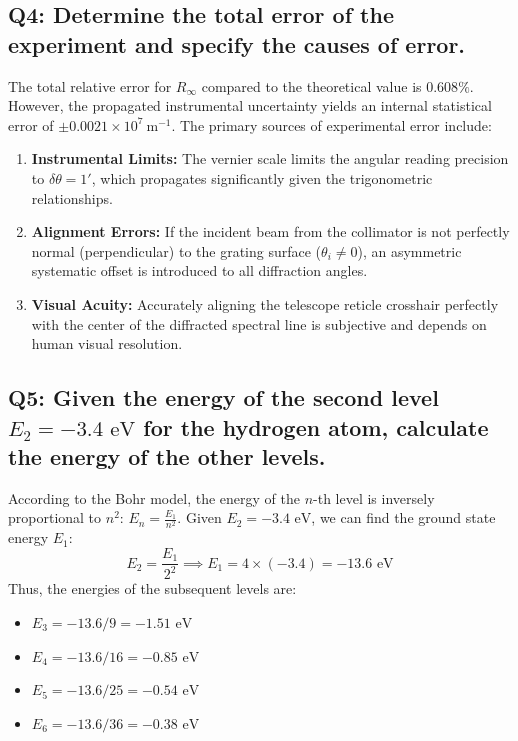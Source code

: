 \documentclass[a4paper,11pt]{article}
\begin{document}
\subsection*{Q4: Determine the total error of the experiment and specify the causes of error.}
The total relative error for $R_\infty$ compared to the theoretical value is $0.608\%$. However, the propagated instrumental uncertainty yields an internal statistical error of $\pm 0.0021 \times 10^7\ \text{m}^{-1}$.
The primary sources of experimental error include:
\begin{enumerate}
    \item \textbf{Instrumental Limits:} The vernier scale limits the angular reading precision to $\delta\theta = 1'$, which propagates significantly given the trigonometric relationships.
    \item \textbf{Alignment Errors:} If the incident beam from the collimator is not perfectly normal (perpendicular) to the grating surface ($\theta_i \neq 0$), an asymmetric systematic offset is introduced to all diffraction angles.
    \item \textbf{Visual Acuity:} Accurately aligning the telescope reticle crosshair perfectly with the center of the diffracted spectral line is subjective and depends on human visual resolution.
\end{enumerate}

\subsection*{Q5: Given the energy of the second level $E_2 = -3.4\text{ eV}$ for the hydrogen atom, calculate the energy of the other levels.}
According to the Bohr model, the energy of the $n$-th level is inversely proportional to $n^2$: $E_n = \frac{E_1}{n^2}$.
Given $E_2 = -3.4\text{ eV}$, we can find the ground state energy $E_1$:
\begin{equation}
    E_2 = \frac{E_1}{2^2} \implies E_1 = 4 \times (-3.4) = -13.6\text{ eV}
\end{equation}
Thus, the energies of the subsequent levels are:
\begin{itemize}
    \item $E_3 = -13.6 / 9 = -1.51\text{ eV}$
    \item $E_4 = -13.6 / 16 = -0.85\text{ eV}$
    \item $E_5 = -13.6 / 25 = -0.54\text{ eV}$
    \item $E_6 = -13.6 / 36 = -0.38\text{ eV}$
\end{itemize}
\end{document}
